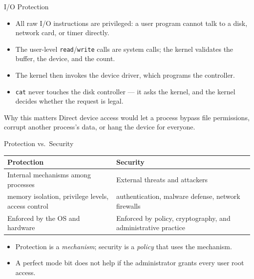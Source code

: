\documentclass[aspectratio=169]{beamer}
\begin{document}
\begin{frame}{I/O Protection}
  \begin{itemize}
    \item All raw I/O instructions are privileged: a user program cannot talk
      to a disk, network card, or timer directly.
    \item The user-level \texttt{read}/\texttt{write} calls are system calls;
      the kernel validates the buffer, the device, and the count.
    \item The kernel then invokes the device driver, which programs the
      controller.
    \item \texttt{cat} never touches the disk controller --- it asks the kernel,
      and the kernel decides whether the request is legal.
  \end{itemize}
  \vspace{0.2cm}
  \begin{alertblock}{Why this matters}
    Direct device access would let a process bypass file permissions, corrupt
    another process's data, or hang the device for everyone.
  \end{alertblock}
\end{frame}

\begin{frame}{Protection vs.\ Security}
  \centering
  \renewcommand{\arraystretch}{1.4}
  \begin{tabular}{p{}p{}}
    \textbf{Protection} & \textbf{Security} \\
    \hline
    Internal mechanisms among processes & External threats and attackers \\
    memory isolation, privilege levels, access control & authentication,
    malware defense, network firewalls \\
    Enforced by the OS and hardware & Enforced by policy, cryptography, and
    administrative practice \\
  \end{tabular}
  \vspace{0.35cm}
  \begin{itemize}
    \item Protection is a \emph{mechanism}; security is a \emph{policy} that
      uses the mechanism.
    \item A perfect mode bit does not help if the administrator grants every
      user root access.
  \end{itemize}
\end{frame}
\end{document}
